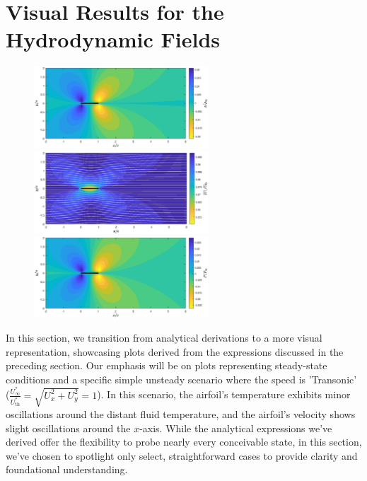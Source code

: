 \section{Visual Results for the Hydrodynamic Fields}
\begin{figure}
\caption{}
    \includegraphics[width=0.58\textwidth]{drawings/SS_U.1_density.eps}
    \vspace{0.07cm}
    \includegraphics[width=0.58\textwidth]{drawings/SS_U.1_velocity.eps}
    \vspace{0.07cm}
    \includegraphics[width=0.58\textwidth]{drawings/SS_U.1_pressure.eps}
    \vspace{0.07cm}
    \begin{minipage}{0.58\textwidth}
    \end{minipage}
    \label{fig:steady_state}
\end{figure}

In this section, we transition from analytical derivations to a more visual representation, showcasing plots derived from the expressions discussed in the preceding section. Our emphasis will be on plots representing steady-state conditions and a specific simple unsteady scenario where the speed is 'Transonic' ($\frac{U_\infty^*}{U_{\mathrm{th}}^*} = \sqrt{U_x^2 + U_y^2} = 1$). In this scenario, the airfoil's temperature exhibits minor oscillations around the distant fluid temperature, and the airfoil's velocity shows slight oscillations around the $x$-axis. While the analytical expressions we've derived offer the flexibility to probe nearly every conceivable state, in this section, we've chosen to spotlight only select, straightforward cases to provide clarity and foundational understanding.

